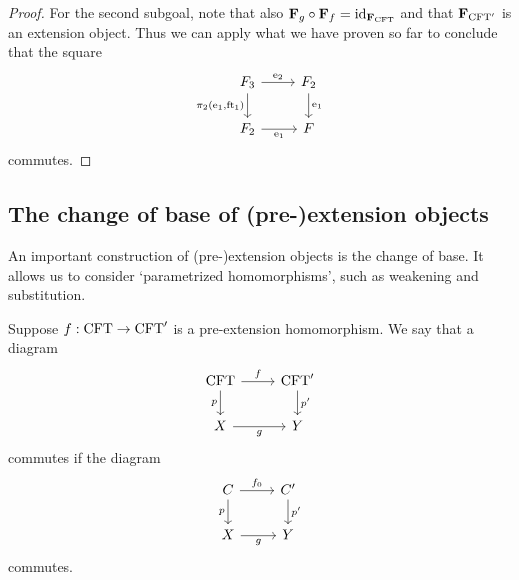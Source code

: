 \begin{proof}
For the second subgoal, note that also $\mathbf{F}_{g}\circ\mathbf{F}_{f}=
{\mathrm{id}_{\mathbf{F}_{\mathrm{CFT}}}}$ and that $\mathbf{F}_{\mathrm{CFT}'}$ is an extension object.
Thus we can apply what we have proven so far to conclude that the square
\begin{equation*}
\begin{tikzcd}
\stesysf_3 
  \ar{r}{\eext{2}} 
  \ar{d}[swap]{\pullbackpr{2}{\efamext}{\eft[1]}} 
  & 
\stesysf_2 
  \ar{d}{\efamext}
  \\
\stesysf_2
  \ar{r}[swap]{\efamext} 
  & 
\stesysf
\end{tikzcd}
\end{equation*}
commutes.
\end{proof}

\subsection{The change of base of (pre-)extension objects}
\label{subsection:change_of_base}
An important construction of (pre-)extension objects is the change of base. It
allows us to consider `parametrized homomorphisms', such as weakening and
substitution.

\begin{defn}
Suppose $f:\mathrm{CFT}\to\mathrm{CFT}'$ is a pre-extension homomorphism. We say that
a diagram
\begin{equation*}
\begin{tikzcd}
\stesys
  \ar{r}{f}
  \ar{d}[swap]{p}
  &
\stesys'
  \ar{d}{p'}
  \\
X \ar{r}[swap]{g}
  &
Y
\end{tikzcd}
\end{equation*}
commutes if the diagram
\begin{equation*}
\begin{tikzcd}
\stesysc
  \ar{r}{f_0}
  \ar{d}[swap]{p}
  &
\stesysc'
  \ar{d}{p'}
  \\
X \ar{r}[swap]{g}
  &
Y
\end{tikzcd}
\end{equation*}
commutes.
\end{defn}

